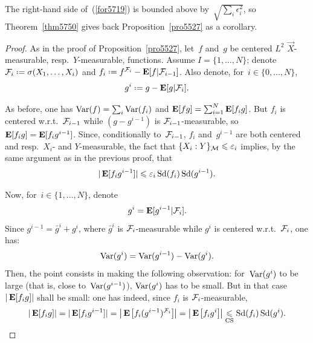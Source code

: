\begin{Rmk}
The right-hand side of~(\ref{for5719}) is bounded above by~$\sqrt{\sum_i \epsilon_i^2}$,
so Theorem~\ref{thm5750} gives back Proposition~\ref{pro5527} as a corollary.
\end{Rmk}
%
\begin{proof}
As in the proof of Proposition~\ref{pro5527},
let~$f$ and~$g$ be centered $L^2$ $\vec{X}$-measurable,
resp.\ $Y$-measurable, functions.
Assume $I=\{1,\ldots,N\}$;
denote $\mcal{F}_i \coloneqq \sigma(X_1,\ldots,X_i)$
and $f_i \coloneqq f^{\mcal{F}_i} - \EE[f|\mcal{F}_{i-1}]$.
Also denote, for~$i\in\{0,\ldots,N\}$,
\[ g^i \coloneqq g - \EE[g|\mcal{F}_i] .\]

As before, one has $\operatorname{Var}(f) = \sum_i\operatorname{Var}(f_i)$ and $\mathop{\smash{\mathbf{E}}}\nolimits[fg] = \sum_{i=1}^N \mathop{\smash{\mathbf{E}}}\nolimits[f_ig]$.
But $f_i$ is centered w.r.t.~$\mathcal{F}_{i-1}$
while $(g - g^{i-1})$ is $\mathcal{F}_{i-1}$-measurable,
so $\mathop{\smash{\mathbf{E}}}\nolimits[f_ig] = \mathop{\smash{\mathbf{E}}}\nolimits[f_ig^{i-1}]$.
Since, conditionally to~$\mathcal{F}_{i-1}$, $f_i$ and~$g^{i-1}$ are both centered and resp.\
$X_i$- and $Y$-measurable, the fact that $\{X_i:Y\}_{\mathcal{M}} \leqslant \varepsilon_i$ implies,
by the same argument as in the previous proof,
that
\[ |\mathop{\smash{\mathbf{E}}}\nolimits[f_ig^{i-1}]| \leqslant \varepsilon_i \operatorname{Sd}(f_i) \operatorname{Sd}(g^{i-1}) .\]

Now, for~$i\in\{1,\ldots,N\}$, denote
\[ \bar{g}^i = \EE[g^{i-1}|\mcal{F}_i] .\]
Since $g^{i-1} = \bar{g}^i + g^i$,
where $\bar{g}^i$ is $\mathcal{F}_i$-measurable while $g^i$ is centered w.r.t.~$\mathcal{F}_i$, one has:
\[ \Var(g^i) = \Var(g^{i-1}) - \Var(\bar{g}^i) .\]
%
Then, the point consists in making the following observation:
for~$\operatorname{Var}(g^i)$ to be large (that is, close to~$\operatorname{Var}(g^{i-1})$),
$\Var(\bar{g}^i)$ has to be small. But in that case
$|\mathop{\smash{\mathbf{E}}}\nolimits[f_ig]|$ shall be small:
one has indeed, since $f_i$ is $\mathcal{F}_i$-measurable,
\[ |\EE[f_ig]| = |\EE[f_ig^{i-1}]|
= \big|\EE\big[f_i(g^{i-1})^{\mcal{F}_i}\big]\big| = \big|\EE\big[f_i\bar{g}^i\big]\big|
\footrel{\text{CS}}{\leq} \ecty(f_i) \ecty(\bar{g}^i) .\]


\end{proof}
